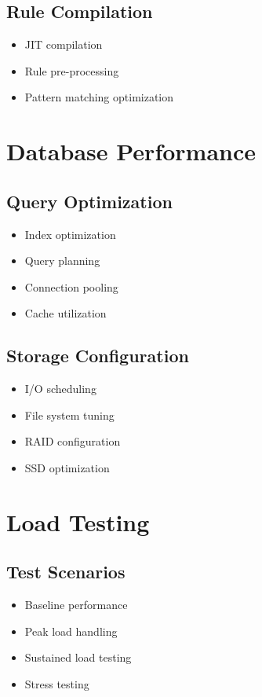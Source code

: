 \documentclass{article}
\begin{document}
\subsection{Rule Compilation}
\begin{itemize}
    \item JIT compilation
    \item Rule pre-processing
    \item Pattern matching optimization
\end{itemize}

\section{Database Performance}

\subsection{Query Optimization}
\begin{itemize}
    \item Index optimization
    \item Query planning
    \item Connection pooling
    \item Cache utilization
\end{itemize}

\subsection{Storage Configuration}
\begin{itemize}
    \item I/O scheduling
    \item File system tuning
    \item RAID configuration
    \item SSD optimization
\end{itemize}

\section{Load Testing}

\subsection{Test Scenarios}
\begin{itemize}
    \item Baseline performance
    \item Peak load handling
    \item Sustained load testing
    \item Stress testing
\end{itemize}
\end{document}
